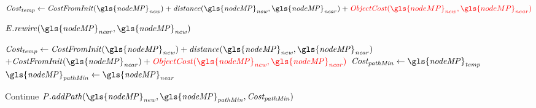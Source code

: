 \begin{algorithm}[H]
\begin{algorithmic}[1]
      \State $\mathit{Cost_{temp}} \leftarrow \mathit{CostFromInit(\gls{nodeMP}_{new})} + \mathit{distance(\gls{nodeMP}_{new}, \gls{nodeMP}_{near})} +\textcolor{red}{\mathit{ObjectCost}(\gls{nodeMP}_{new}, \gls{nodeMP}_{near})}$

      \State $\mathit{E.rewire(\gls{nodeMP}_{near}, \gls{nodeMP}_{new})}$
      \EndIf
      \Else {}

      \State $\mathit{Cost_{temp} \leftarrow CostFromInit(\gls{nodeMP}_{new}) + distance(\gls{nodeMP}_{new}, \gls{nodeMP}_{near})} $ \newline\hspace*{10em} $+ \mathit{CostFromInit(\gls{nodeMP}_{near}) + \textcolor{red}{ObjectCost(\gls{nodeMP}_{new}, \gls{nodeMP}_{near})}}$
      \State $\mathit{Cost_{pathMin} \leftarrow \gls{nodeMP}_{temp}}$
      \State $\mathit{\gls{nodeMP}_{pathMin} \leftarrow \gls{nodeMP}_{near}}$
      \EndIf
      \EndIf

      \State Continue
      \Else
      \State $\mathit{P.addPath(\gls{nodeMP}_{new}, \gls{nodeMP}_{pathMin}, Cost_{pathMin})}$
      \EndIf

      \EndFor

    \EndWhile
  \end{algorithmic}
\end{algorithm}




